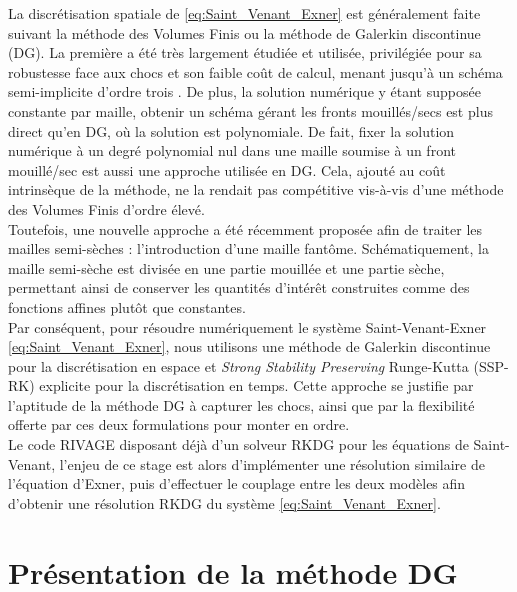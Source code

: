 \documentclass[11pt, a4paper, oneside]{report}
\begin{document}
La discrétisation spatiale de \eqref{eq:Saint_Venant_Exner} est généralement faite suivant la méthode des Volumes Finis ou la méthode de Galerkin discontinue (DG). La première a été très largement étudiée et utilisée, privilégiée pour sa robustesse face aux chocs et son faible coût de calcul, menant jusqu'à un schéma semi-implicite d'ordre trois \cite{fernandez2025third}. De plus, la solution numérique y étant supposée constante par maille, obtenir un schéma gérant les fronts mouillés/secs est plus direct qu'en DG, où la solution est polynomiale. De fait, fixer la solution numérique à un degré polynomial nul dans une maille soumise à un front mouillé/sec est aussi une approche utilisée en DG. Cela, ajouté au coût intrinsèque de la méthode, ne la rendait pas compétitive vis-à-vis d'une méthode des Volumes Finis d'ordre élevé. \\
Toutefois, une nouvelle approche a été récemment proposée \cite{poussel2025wetting} afin de traiter les mailles semi-sèches : l'introduction d'une maille fantôme. Schématiquement, la maille semi-sèche est divisée en une partie mouillée et une partie sèche, permettant ainsi de conserver les quantités d'intérêt construites comme des fonctions affines plutôt que constantes. \\
Par conséquent, pour résoudre numériquement le système Saint-Venant-Exner \eqref{eq:Saint_Venant_Exner}, nous utilisons une méthode de Galerkin discontinue pour la discrétisation en espace et \textit{Strong Stability Preserving} Runge-Kutta (SSP-RK) explicite pour la discrétisation en temps. Cette approche se justifie par l'aptitude de la méthode DG à capturer les chocs, ainsi que par la flexibilité offerte par ces deux formulations pour monter en ordre. \\
Le code RIVAGE disposant déjà d'un solveur RKDG pour les équations de Saint-Venant, l'enjeu de ce stage est alors d'implémenter une résolution similaire de l'équation d'Exner, puis d'effectuer le couplage entre les deux modèles afin d'obtenir une résolution RKDG du système \eqref{eq:Saint_Venant_Exner}.

\section{Présentation de la méthode DG}
\end{document}
